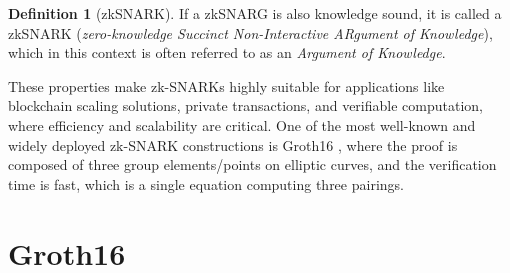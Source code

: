 \documentclass[12pt]{article}
\theoremstyle{definition}
\newtheorem{definition}{Definition}[section]
\begin{document}
\begin{definition}[zkSNARK]If a zkSNARG is also knowledge sound, it is called a zkSNARK (\emph{zero-knowledge Succinct Non-Interactive ARgument of Knowledge}), which in this context is often referred to as an \emph{Argument of Knowledge}.
\end{definition}

These properties make zk-SNARKs highly suitable for applications like blockchain scaling solutions, private transactions, and verifiable computation, where efficiency and scalability are critical. One of the most well-known and widely deployed zk-SNARK constructions is Groth16 \cite{groth16}, where the proof is composed of three group elements/points on elliptic curves, and the verification time is fast, which is a single equation computing three pairings.

\section{Groth16}\label{sec:groth16}
\printbibliography
\end{document}
